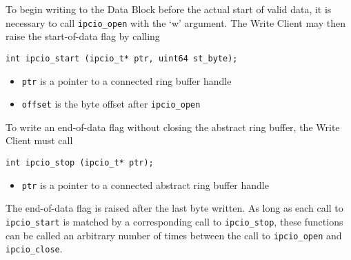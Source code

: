 To begin writing to the Data Block before the actual start of valid data, 
it is necessary to call {\tt ipcio\_open} with the `w' argument.
The Write Client may then raise the start-of-data flag by calling
\begin{verbatim}
int ipcio_start (ipcio_t* ptr, uint64 st_byte);
\end{verbatim}
\vspace{-6mm}
\begin{itemize}
\item {\tt ptr} is a pointer to a connected ring buffer handle
\vspace{-2mm}
\item {\tt offset} is the byte offset after {\tt ipcio\_open}
\end{itemize}
To write an end-of-data flag without closing
the abstract ring buffer, the Write Client must call
\begin{verbatim}
int ipcio_stop (ipcio_t* ptr);
\end{verbatim}
\vspace{-6mm}
\begin{itemize}
\item {\tt ptr} is a pointer to a connected abstract ring buffer handle
\end{itemize}
The end-of-data flag is raised after the last byte written.  
As long as each call to {\tt ipcio\_start} is matched by a corresponding
call to {\tt ipcio\_stop}, these functions can be called an arbitrary
number of times between the call to {\tt ipcio\_open} 
and {\tt ipcio\_close}.

